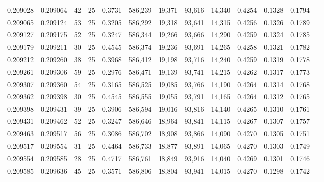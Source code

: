 \begin{tabular}{rrrrrrrrrrrrr}
0.209028 & 0.209064 &  42 &  25 &                                     0.3731 & 586,239 &  19,371 &  93,616 &  14,340 & 0.4254 & 0.1328 & 0.1794 \\
0.209065 & 0.209124 &  53 &  25 &                                     0.3205 & 586,292 &  19,318 &  93,641 &  14,315 & 0.4256 & 0.1326 & 0.1789 \\
0.209127 & 0.209175 &  52 &  25 &                                     0.3247 & 586,344 &  19,266 &  93,666 &  14,290 & 0.4259 & 0.1324 & 0.1785 \\
0.209179 & 0.209211 &  30 &  25 &                                     0.4545 & 586,374 &  19,236 &  93,691 &  14,265 & 0.4258 & 0.1321 & 0.1782 \\
0.209212 & 0.209260 &  38 &  25 &                                     0.3968 & 586,412 &  19,198 &  93,716 &  14,240 & 0.4259 & 0.1319 & 0.1778 \\
0.209261 & 0.209306 &  59 &  25 &                                     0.2976 & 586,471 &  19,139 &  93,741 &  14,215 & 0.4262 & 0.1317 & 0.1773 \\
0.209307 & 0.209360 &  54 &  25 &                                     0.3165 & 586,525 &  19,085 &  93,766 &  14,190 & 0.4264 & 0.1314 & 0.1768 \\
0.209362 & 0.209398 &  30 &  25 &                                     0.4545 & 586,555 &  19,055 &  93,791 &  14,165 & 0.4264 & 0.1312 & 0.1765 \\
0.209398 & 0.209431 &  39 &  25 &                                     0.3906 & 586,594 &  19,016 &  93,816 &  14,140 & 0.4265 & 0.1310 & 0.1761 \\
0.209431 & 0.209462 &  52 &  25 &                                     0.3247 & 586,646 &  18,964 &  93,841 &  14,115 & 0.4267 & 0.1307 & 0.1757 \\
0.209463 & 0.209517 &  56 &  25 &                                     0.3086 & 586,702 &  18,908 &  93,866 &  14,090 & 0.4270 & 0.1305 & 0.1751 \\
0.209517 & 0.209554 &  31 &  25 &                                     0.4464 & 586,733 &  18,877 &  93,891 &  14,065 & 0.4270 & 0.1303 & 0.1749 \\
0.209554 & 0.209585 &  28 &  25 &                                     0.4717 & 586,761 &  18,849 &  93,916 &  14,040 & 0.4269 & 0.1301 & 0.1746 \\
0.209585 & 0.209636 &  45 &  25 &                                     0.3571 & 586,806 &  18,804 &  93,941 &  14,015 & 0.4270 & 0.1298 & 0.1742 \\

\end{tabular}

